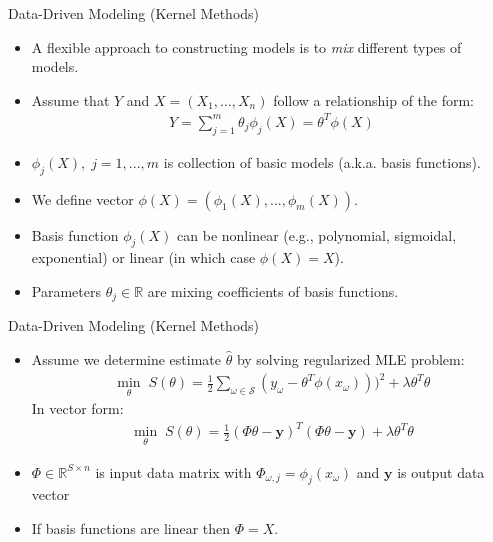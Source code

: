\documentclass[handout,9pt]{beamer}
\begin{document}

\begin{frame}{Data-Driven Modeling (Kernel Methods)}
\begin{itemize}
  \setlength{\itemsep}{10pt}
\item A flexible approach to constructing models is to {\em mix} different types of models.  
\item Assume that $Y$ and $X=(X_1,...,X_n)$ follow a relationship of the form:
\begin{align*}
Y=\sum_{j=1}^m\theta_j \phi_j(X)=\theta^T\phi(X)
\end{align*}
\item $\phi_j(X),\; j=1,...,m$ is collection of basic models (a.k.a. basis functions). 

\item We define vector $\phi(X)=(\phi_1(X),...,\phi_m(X))$. 

\item Basis function $\phi_j(X)$ can be nonlinear (e.g., polynomial, sigmoidal, exponential) or linear (in which case $\phi(X)=X$). 

\item Parameters $\theta_j\in \mathbb{R}$ are mixing coefficients of basis functions.  

\end{itemize}

\end{frame}


\begin{frame}{Data-Driven Modeling (Kernel Methods)}
\begin{itemize}
  \setlength{\itemsep}{10pt}
\item Assume we determine estimate $\hat{\theta}$ by solving regularized MLE problem:
\begin{align*}
\min_{\theta}\; S(\theta)= \frac{1}{2}\sum_{\omega \in \mathcal{S}}(y_\omega-\theta^T\phi(x_\omega)))^2+\lambda \theta^T\theta
\end{align*}
In vector form:
\begin{align*}
\min_{\theta}\; S(\theta)= \frac{1}{2}(\Phi\theta -\mathbf{y})^T(\Phi\theta-\mathbf{y})+\lambda\theta^T\theta
\end{align*}
\item $\Phi\in \mathbb{R}^{S\times n}$ is input data matrix with $\Phi_{\omega,j}=\phi_{j}(x_\omega)$ and $\mathbf{y}$ is output data vector

\item If basis functions are linear then $\Phi=X$. 

\end{itemize}

\end{frame}
\end{document}
